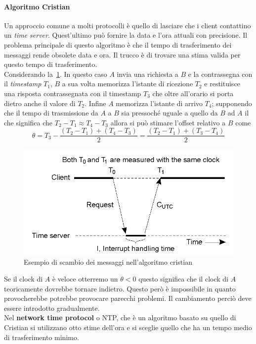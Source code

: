 \paragraph{Algoritmo Cristian}
Un approccio comune a molti protocolli è quello di lasciare che i client contattino un \emph{time server}. Quest'ultimo può fornire la data e l'ora attuali con precisione. Il problema principale di questo algoritmo è che il tempo di trasferimento dei messaggi rende obsolete data e ora. Il trucco è di trovare una stima valida per questo tempo di trasferimento.\\
Considerando la \figurename\,\ref{fig:cristian}.  In questo caso $A$ invia una richiesta a $B$ e la contrassegna con il \emph{timestamp} $T_1$, $B$ a sua volta memorizza l'istante di ricezione $T_2$ e restituisce una risposta contrassegnata con il timestamp $T_3$ che oltre all'orario si porta dietro anche il valore di $T_2$. Infine $A$ memorizza l'istante di arrivo $T_4$; supponendo che il tempo di trasmissione da $A$ a $B$ sia pressoché uguale a quello da $B$ ad $A$ il che significa che $T_2 - T_1 \approx T_4 - T_3$ allora si può stimare l'offset relativo a $B$ come
$$\theta = T_3 - \frac{(T_2 - T_1)+(T_4 - T_3)}{2}= \frac{(T_2 - T_1)+(T_3 - T_4)}{2}$$
\begin{figure}
\centering
\includegraphics[scale=0.5]{img/cristian.png}
\caption{Esempio di scambio dei messaggi nell'algoritmo cristian}\label{fig:cristian}
\end{figure}
Se il clock di $A$ è veloce otterremo un $\theta<0$ questo significa che il clock di $A$ teoricamente dovrebbe tornare indietro. Questo però è impossibile in quanto provocherebbe potrebbe provocare parecchi problemi. Il cambiamento perciò deve essere introdotto gradualmente.\\
Nel \textbf{network time protocol} o NTP, che è un algoritmo basato su quello di Cristian si utilizzano otto stime dell'ora e si sceglie quello che ha un tempo medio di trasferimento minimo.
